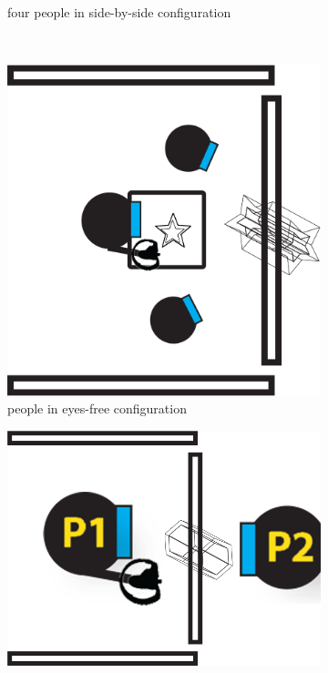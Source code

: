 \documentclass[chi_draft]{sigchi}
\begin{document}
\begin{figure}
\begin{subfigure}[b]{0.3\columnwidth}
        \caption{four people in side-by-side configuration}
        \label{fig:sbs4}
    \end{subfigure}
    ~ %
    \begin{subfigure}[b]{0.3\columnwidth}
        \includegraphics[width=1\columnwidth]{eyes-free}
        \caption{people in eyes-free configuration}
        \label{fig:ef}
    \end{subfigure}
    \begin{subfigure}[b]{0.3\columnwidth}
        \includegraphics[width=1\columnwidth]{f2f-1.png}

\end{subfigure}
\end{figure}
\end{document}
